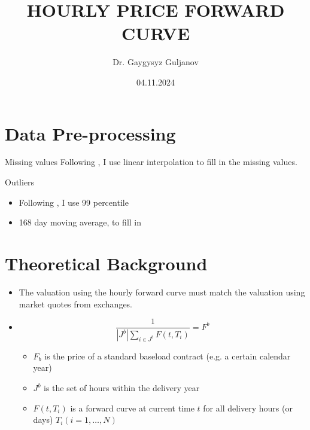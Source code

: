 \documentclass{beamer}
\title{\fontsize{12pt}{15pt} \selectfont HOURLY PRICE FORWARD CURVE}
\author{Dr. Gaygysyz Guljanov}
\institute{University of Münster}
\date{04.11.2024}
\begin{document}
\frame{\titlepage}


\section{Data Pre-processing}

\begin{frame}{Missing values}
    Following \cite{SvantessonRastegar-2019}, I use linear interpolation to fill in the missing values.
\end{frame}


\begin{frame}{Outliers}
    \begin{itemize}
        \item Following \cite{SvantessonRastegar-2019}, I use 99 percentile

        \item 168 day moving average, to fill in
    \end{itemize}
\end{frame}



\section{Theoretical Background}

\begin{frame}
    \begin{itemize}
        \item The valuation using the hourly forward curve must match the valuation using market quotes from exchanges.

        \item
              \[
                  \frac{1}{|J^b| \sum_{i \in J^b} F(t, T_i)} = F^b
              \]
              \begin{itemize}
                  \item $F_b$ is the price of a standard baseload contract (e.g. a certain calendar year)
                  \item $J^b$ is the set of hours within the delivery year
                  \item $F(t, T_i)$ is a forward curve at current time $t$ for all delivery hours (or days) $T_i (i = 1, \ldots, N)$
              \end{itemize}
    \end{itemize}
\end{frame}
\end{document}
